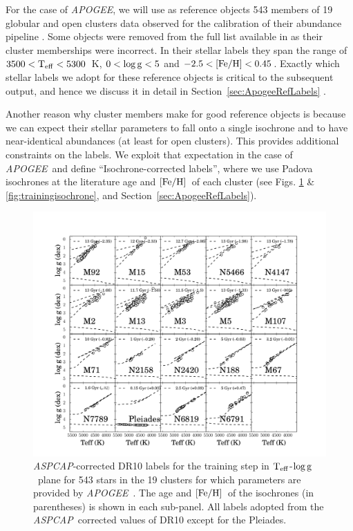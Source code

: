 \documentclass[12pt, preprint]{aastex}
\newcommand{\sectionname}{Section}
\newcommand{\apogee}{\textsl{APOGEE}}
\newcommand{\aspcap}{\textsl{ASPCAP}}
\newcommand{\teff}{\mbox{$\rm T_{eff}$}}
\newcommand{\feh}{\mbox{$\rm [Fe/H]$}}
\newcommand{\logg}{\mbox{$\rm \log g$}}
\begin{document}
For the case of \apogee, we will use as reference objects 543 members of 19 globular and open clusters data observed for the
calibration of their abundance pipeline \citep{Meszaros2013}. Some objects were removed from the full list available in \citep{Meszaros2013} as their cluster memberships were incorrect. In their stellar labels they span the range of $3500<\teff<5300$~K, $0<\logg<5$ and $-2.5<\feh<0.45$. 
Exactly which stellar labels we adopt for these reference objects is critical to the subsequent output, and hence 
we discuss it in detail in \sectionname~\ref{sec:ApogeeRefLabels} .

Another reason why cluster members make for good reference objects is because we can expect their stellar parameters to fall onto a single isochrone and to have near-identical abundances (at least for open clusters). This provides additional constraints on the labels.
We exploit that expectation in the case of \apogee\ and define ``Isochrone-corrected labels'', where we use Padova isochrones at the literature age and \feh\ of each cluster (see Figs. \ref{fig:trainingaspcap} \& \ref{fig:trainingisochrone}, and \sectionname~\ref{sec:ApogeeRefLabels}).


\begin{figure}[h!]
\centering
    \includegraphics[scale=0.31]{./plots/training_aspcap2.pdf}
\caption{\aspcap-corrected DR10 labels  for the training step in \teff-\logg\ plane for 543 stars in the 19 clusters for which parameters are provided by \apogee\ \citep{Meszaros2013}. The age and \feh\ of the isochrones (in parentheses) is shown in each sub-panel. All labels adopted from the \aspcap\ corrected values of DR10 except for the Pleiades. }
\label{fig:trainingaspcap}
\end{figure}
\end{document}

